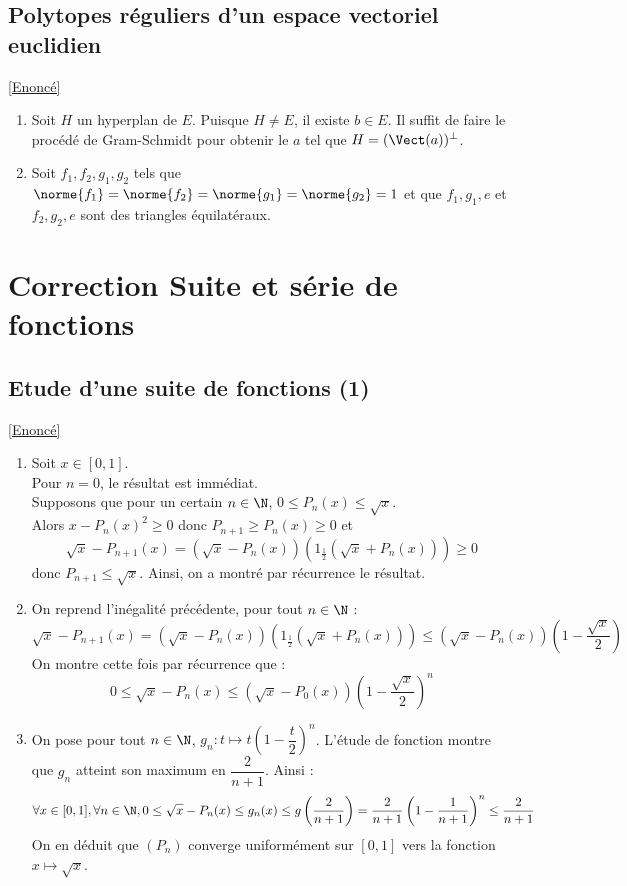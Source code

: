 \documentclass{book}
\begin{document}
	\subsection{Polytopes réguliers d'un espace vectoriel euclidien}\label{sec:polytopes-reguliers-dun-espace-vectoriel-euclidien}
		\textcolor{blue}{\hyperref[Polytopes réguliers d'un espace vectoriel euclidien]{[Enoncé]}}\\
	\begin{enumerate}
		\item Soit $H$ un hyperplan de $E$. Puisque $H\ne E$, il existe $b\in E$. Il suffit de faire le procédé de Gram-Schmidt pour obtenir le $a$ tel que $H=(\Vect(a))^\perp$.
		\item Soit $f_1,f_2,g_1,g_2$ tels que $\norme{f_1}=\norme{f_2}=\norme{g_1}=\norme{g_2}=1$ et que $f_1,g_1,e$ et $f_2,g_2,e$ sont des triangles équilatéraux.\\
		
	\end{enumerate}
	\newpage
	\section{Correction Suite et série de fonctions}
	\subsection{Etude d'une suite de fonctions (1)}\label{sec:etude-dune-suite-de-fonctions-1}
		\textcolor{blue}{\hyperref[Etude d'une suite de fonctions 1]{[Enoncé]}}\\
	\begin{enumerate}[leftmargin=*]
		\item Soit $x\in [0,1]$.\\
		Pour $n=0$, le résultat est immédiat.\\
		Supposons que pour un certain $n\in\N$, $0\leq P_n(x)\leq \sqrt{x}$.\\
		Alors $x-P_n(x)^2\geq 0$ donc $P_{n+1}\geq P_n(x)\geq 0$ et \[\sqrt{x}-P_{n+1}(x)=(\sqrt{x}-P_n(x))\left(1_\frac{1}{2}(\sqrt{x}+P_n(x))\right)\geq 0\]
		donc $P_{n+1}\leq\sqrt{x}$.
		Ainsi, on a montré par récurrence le résultat.
		\item On reprend l'inégalité précédente, pour tout $n\in\N$ : 
		\[\sqrt{x}-P_{n+1}(x)=(\sqrt{x}-P_n(x))\left(1_\frac{1}{2}(\sqrt{x}+P_n(x))\right)\leq(\sqrt{x}-P_n(x))\left(1-\frac{\sqrt{x}}{2}\right)\]
		On montre cette fois par récurrence que :
		\[0\leq \sqrt{x}-P_n(x)\leq (\sqrt{x}-P_0(x))\left(1-\frac{\sqrt{x}}{2}\right)^n\]
		\item On pose pour tout $n\in \N$, $g_n:t\mapsto t\left(1-\dfrac{t}{2}\right)^n$. L'étude de fonction montre que $g_n$ atteint son maximum en $\dfrac{2}{n+1}$. Ainsi : 
		\[\forall x\in [0,1], \forall n\in \N, 0\leq \sqrt{x}-P_n(x)\leq g_n(x)\leq g\left(\frac{2}{n+1}\right)=\frac{2}{n+1}\left(1-\frac{1}{n+1}\right)^n\leq \frac{2}{n+1}\]
		On en déduit que $(P_n)$ converge uniformément sur $[0,1]$ vers la fonction $x\mapsto \sqrt{x}$.
	\end{enumerate}
\end{document}
